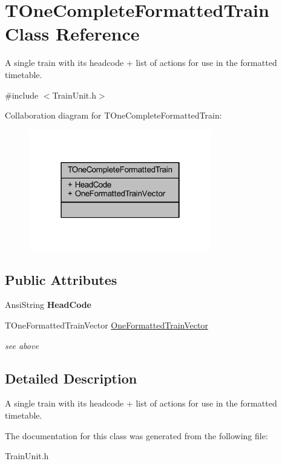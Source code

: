 \hypertarget{class_t_one_complete_formatted_train}{}\section{T\+One\+Complete\+Formatted\+Train Class Reference}
\label{class_t_one_complete_formatted_train}


A single train with its headcode + list of actions for use in the formatted timetable.  




{\ttfamily \#include $<$Train\+Unit.\+h$>$}



Collaboration diagram for T\+One\+Complete\+Formatted\+Train\+:\nopagebreak
\begin{figure}[H]
\begin{center}
\leavevmode
\includegraphics[width=226pt]{class_t_one_complete_formatted_train__coll__graph}
\end{center}
\end{figure}
\subsection*{Public Attributes}
\begin{DoxyCompactItemize}
\item 
\mbox{\label{class_t_one_complete_formatted_train_a64e2c06ac8ceb57b8f2cf4fe316fdd09}} 
Ansi\+String {\bfseries Head\+Code}
\item 
\mbox{\label{class_t_one_complete_formatted_train_a7153d13265831ee7c241779b5c803278}} 
T\+One\+Formatted\+Train\+Vector \mbox{\hyperlink{class_t_one_complete_formatted_train_a7153d13265831ee7c241779b5c803278}{One\+Formatted\+Train\+Vector}}
\begin{DoxyCompactList}\small\item\em see above \end{DoxyCompactList}\end{DoxyCompactItemize}


\subsection{Detailed Description}
A single train with its headcode + list of actions for use in the formatted timetable. 

The documentation for this class was generated from the following file\+:\begin{DoxyCompactItemize}
\item 
Train\+Unit.\+h\end{DoxyCompactItemize}
